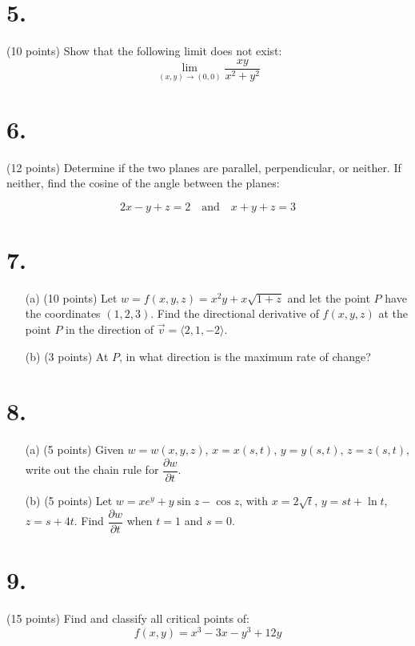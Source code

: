 \newpage

\section*{5.}
(10 points) Show that the following limit does not exist:
\[
\lim_{(x,y)\to(0,0)} \frac{xy}{x^2 + y^2}
\]

\section*{6.}
(12 points) Determine if the two planes are parallel, perpendicular, or neither. If neither, find the cosine of the angle between the planes:

\[
2x - y + z = 2 \quad \text{and} \quad x + y + z = 3
\]

\newpage

\section*{7.}
\begin{itemize}
    \item[(a)] (10 points) Let $w = f(x, y, z) = x^2y + x\sqrt{1 + z}$ and let the point  $P$ have the coordinates $(1, 2, 3)$. Find the directional derivative of $f(x,y,z)$ at the point $P$ in the direction of $\vec{v} = \langle 2, 1, -2 \rangle$.
    \item[(b)] (3 points) At $P$, in what direction is the maximum rate of change?
\end{itemize}

\newpage

\section*{8.}
\begin{itemize}
    \item[(a)] (5 points) Given $w = w(x, y, z)$, $x = x(s, t)$, $y = y(s, t)$, $z = z(s, t)$, write out the chain rule for $\dfrac{\partial w}{\partial t}$.
    \item[(b)] (5 points) Let $w = x e^y + y\sin z - \cos z$, with $x = 2\sqrt{t}$, $y = st + \ln t$, $z = s + 4t$. Find $\dfrac{\partial w}{\partial t}$ when $t = 1$ and $s = 0$.
\end{itemize}

\newpage

\section*{9.}
(15 points) Find and classify all critical points of:
\[
f(x, y) = x^3 - 3x - y^3 + 12y
\]


